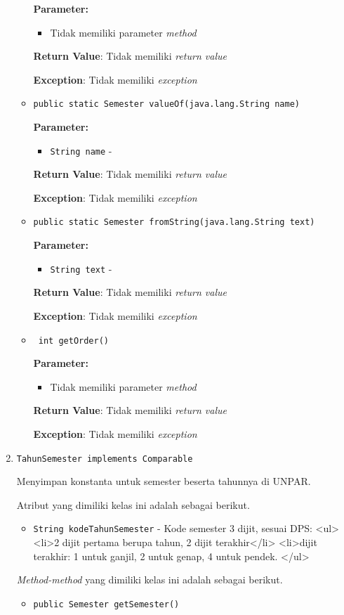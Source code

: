 \documentclass{article}
\begin{document}
\begin{enumerate}
\begin{itemize}
\textbf{Parameter:}
\begin{itemize}
\item Tidak memiliki parameter \textit{method}
\end{itemize}
\textbf{Return Value}: Tidak memiliki \textit{return value}

\textbf{Exception}: Tidak memiliki \textit{exception}

\item \texttt{public static Semester valueOf(java.lang.String name)}

\textbf{Parameter:}
\begin{itemize}
\item \texttt{String name} - 
\end{itemize}
\textbf{Return Value}: Tidak memiliki \textit{return value}

\textbf{Exception}: Tidak memiliki \textit{exception}

\item \texttt{public static Semester fromString(java.lang.String text)}

\textbf{Parameter:}
\begin{itemize}
\item \texttt{String text} - 
\end{itemize}
\textbf{Return Value}: Tidak memiliki \textit{return value}

\textbf{Exception}: Tidak memiliki \textit{exception}

\item \texttt{ int getOrder()}

\textbf{Parameter:}
\begin{itemize}
\item Tidak memiliki parameter \textit{method}
\end{itemize}
\textbf{Return Value}: Tidak memiliki \textit{return value}

\textbf{Exception}: Tidak memiliki \textit{exception}

\end{itemize}
\item \texttt{TahunSemester implements Comparable}

Menyimpan konstanta untuk semester beserta tahunnya di UNPAR.

Atribut yang dimiliki kelas ini adalah sebagai berikut.
\begin{itemize}
\item \texttt{String kodeTahunSemester} - Kode semester 3 dijit, sesuai DPS:
 <ul>
   <li>2 dijit pertama berupa tahun, 2 dijit terakhir</li>
   <li>dijit terakhir: 1 untuk ganjil, 2 untuk genap, 4 untuk pendek.
 </ul>
\end{itemize}
\textit{Method-method} yang dimiliki kelas ini adalah sebagai berikut.
\begin{itemize}
\item \texttt{public Semester getSemester()}


\end{itemize}
\end{enumerate}
\end{document}
